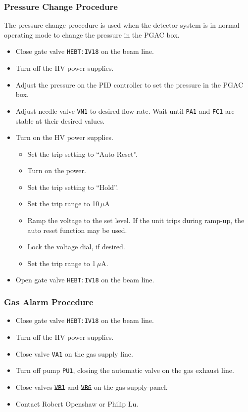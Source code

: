 \subsubsection{Pressure Change Procedure}
The pressure change procedure is used when the detector system is in normal operating mode to change the pressure in the PGAC box.
\begin{itemize}
\setlength{\itemsep}{0pt}
\setlength{\parskip}{0pt}
\setlength{\parsep}{0pt}
\item Close gate valve \texttt{HEBT:IV18} on the beam line.
\item Turn off the HV power supplies.
\item Adjust the pressure on the PID controller to set the pressure in the PGAC box.
\item Adjust needle valve \texttt{VN1} to desired flow-rate.  Wait until \texttt{PA1} and \texttt{FC1} are stable at their desired values.
\item Turn on the HV power supplies.
\begin{itemize}
\setlength{\itemsep}{0pt}
\setlength{\parskip}{0pt}
\setlength{\parsep}{0pt}
\item Set the trip setting  to ``Auto Reset''.
\item Turn on the power.
\item Set the trip setting to ``Hold''.
\item Set the trip range to 10\,$\mu$A
\item Ramp the voltage to the set level.  If the unit trips during ramp-up, the auto reset function may be used. 
\item Lock the voltage dial, if desired.
\item Set the trip range to 1\,$\mu$A.
\end{itemize}

\item Open gate valve \texttt{HEBT:IV18} on the beam line.
\end{itemize}
\subsubsection{Gas Alarm Procedure}
\begin{itemize}
\setlength{\itemsep}{0pt}
\setlength{\parskip}{0pt}
\setlength{\parsep}{0pt}

\item Close gate valve \texttt{HEBT:IV18} on the beam line.
\item Turn off the HV power supplies.
\item Close valve \texttt{VA1} on the gas supply line.
\item Turn off pump \texttt{PU1}, closing the automatic valve on the gas exhaust line.
\item \sout{Close valves \texttt{VB1} and \texttt{VB6} on the gas supply panel.} %
\item Contact Robert Openshaw or Philip Lu.
\end{itemize}

